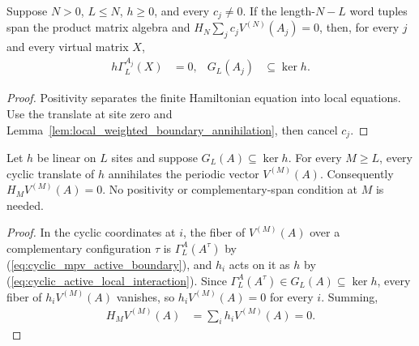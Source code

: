 \begin{lemma}
    \label{lem:finite_volume_local_kernel_inclusion}
    \leanok
    Suppose $N>0$, $L\le N$, $h\ge0$, and every $c_j\ne0$. If the length-$N-L$
    word tuples span the product matrix algebra and
    $H_N\sum_jc_jV^{(N)}(A_j)=0$, then, for every $j$ and every virtual
    matrix $X$,
    \begin{align}
        h\Gamma_L^{A_j}(X) & =0, & G_L(A_j) & \subseteq\ker h.
        \label{eq:finite_volume_local_kernel_inclusion}
    \end{align}
\end{lemma}
\begin{proof}\leanok
    Positivity separates the finite Hamiltonian equation into local equations.
    Use the translate at site zero and
    Lemma~\ref{lem:local_weighted_boundary_annihilation}, then cancel $c_j$.
\end{proof}

\begin{lemma}
    \label{lem:local_mps_kernel_all_volumes}
    \leanok
    Let $h$ be linear on $L$ sites and suppose $G_L(A)\subseteq\ker h$.
    For every $M\ge L$, every cyclic translate of $h$ annihilates the
    periodic vector $V^{(M)}(A)$. Consequently $H_MV^{(M)}(A)=0$.
    No positivity or complementary-span condition at $M$ is needed.
\end{lemma}
\begin{proof}\leanok
    In the cyclic coordinates at $i$, the fiber of $V^{(M)}(A)$ over a
    complementary configuration $\tau$ is
    $\Gamma_L^A(A^\tau)$ by (\ref{eq:cyclic_mpv_active_boundary}), and
    $h_i$ acts on it as $h$ by (\ref{eq:cyclic_active_local_interaction}).
    Since $\Gamma_L^A(A^\tau)\in G_L(A)\subseteq\ker h$, every fiber of
    $h_iV^{(M)}(A)$ vanishes, so $h_iV^{(M)}(A)=0$ for every $i$. Summing,
    \begin{align}
        H_MV^{(M)}(A) & =\sum_ih_iV^{(M)}(A)=0.
        \label{eq:local_mps_kernel_all_volumes_sum}
    \end{align}
\end{proof}

